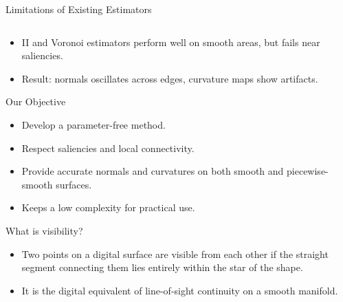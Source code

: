 \documentclass[11pt]{beamer}
\begin{document}
\begin{frame}{Limitations of Existing Estimators}
\begin{columns}
        \end{columns}
        \vspace{0.3cm}
        \begin{itemize}
            \item II and Voronoi estimators perform well on smooth areas,
            but fails near saliencies.
            \item Result: normals oscillates across edges, curvature maps show artifacts.
        \end{itemize}
    \end{frame}
    \begin{frame}{Our Objective}
        \begin{itemize}
            \item Develop a parameter-free method.
            \item Respect saliencies and local connectivity.
            \item Provide accurate normals and curvatures on both smooth and piecewise-smooth surfaces.
            \item Keeps a low complexity for practical use.
        \end{itemize}
    \end{frame}

    \begin{frame}{What is visibility?}
        \begin{itemize}
            \item Two points on a digital surface are visible from each other if the straight segment connecting them lies entirely within the star of the shape.
            \item It is the digital equivalent of line-of-sight continuity on a smooth manifold.
        \end{itemize}
        \vspace{0.3cm}
        \centering
        \hspace{-1cm}
    \end{frame}
\end{document}
